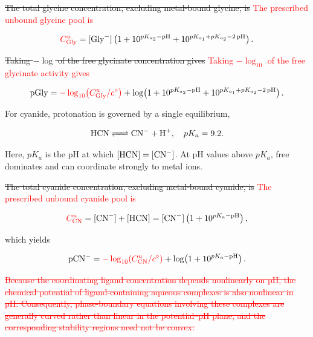 \documentclass[twoside,twocolumn,9pt]{article}
\begin{document}
\sout{The total glycine concentration, excluding metal-bound glycine, is} \textcolor{red}{The prescribed unbound glycine pool is}

\begin{equation} \label{eq:Gly_massbalance}
    \textcolor{red}{C_{\mathrm{Gly}}^u}
    = [\ce{Gly^-}]
      \left(
          1 + 10^{pK_{a_2}-\mathrm{pH}} + 10^{pK_{a_1}+pK_{a_2}-2\,\mathrm{pH}}
      \right).
\end{equation}

\sout{Taking \(-\log\) of the free glycinate concentration gives} \textcolor{red}{Taking $-\log_{10}$ of the free glycinate activity gives}

\begin{equation} \label{eq:pGly}
    \mathrm{pGly}
    = \textcolor{red}{-\log_{10}\!\left(C_{\mathrm{Gly}}^u/c^\circ\right)}
      + \log\!\left(
            1 + 10^{pK_{a_2}-\mathrm{pH}}
              + 10^{pK_{a_1}+pK_{a_2}-2\,\mathrm{pH}}
        \right).
\end{equation}

For cyanide, protonation is governed by a single equilibrium,

\begin{equation} \label{eq:HCN_equilibrium}
    \ce{HCN <=> CN^- + H+}, \quad pK_a = 9.2 .
\end{equation}

Here, \(pK_a\) is the pH at which \([\ce{HCN}] = [\ce{CN^-}]\). At pH values above \(pK_a\), free  dominates and can coordinate strongly to metal ions.

\sout{The total cyanide concentration, excluding metal-bound cyanide, is} \textcolor{red}{The prescribed unbound cyanide pool is}

\begin{equation} \label{eq:CN_massbalance}
    \textcolor{red}{C_{\mathrm{CN}}^u}
    = [\ce{CN^-}] + [\ce{HCN}]
    = [\ce{CN^-}]\left(1 + 10^{pK_a - \mathrm{pH}}\right),
\end{equation}

which yields

\begin{equation} \label{eq:pCN}
    \mathrm{pCN}^-
    = \textcolor{red}{-\log_{10}\!\left(C_{\mathrm{CN}}^u/c^\circ\right)}
      + \log\!\left(1 + 10^{pK_a - \mathrm{pH}}\right).
\end{equation}

\textcolor{red}{\sout{Because the coordinating ligand concentration depends nonlinearly on pH, the chemical potential of ligand-containing aqueous complexes is also nonlinear in pH. Consequently, phase-boundary equations involving these complexes are generally curved rather than linear in the potential–pH plane, and the corresponding stability regions need not be convex.}}
\end{document}

